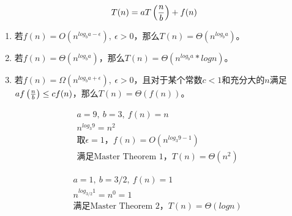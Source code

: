 \vspace{-0.5cm}

$$
	T(n) = aT\left( {n \over b} \right) + f(n)
$$

\begin{enumerate}
	\item 若$ f(n) = O \left( n^{log_b{a-\epsilon}} \right),\ \epsilon > 0 $，那么$ T(n) = \Theta \left( n^{log_b{a}} \right) $。

	\item 若$ f(n) = \Theta \left( n^{log_b{a}} \right) $，那么$ T(n) = \Theta \left( n^{log_b{a}} * logn \right) $。

	\item 若$ f(n) = \Omega \left( n^{log_b{a+\epsilon}} \right),\ \epsilon > 0 $，且对于某个常数$ c < 1 $和充分大的$ n $满足$ af\left( {n \over b} \right) \le cf(n) $，那么$ T(n) = \Theta(f(n)) $。
\end{enumerate}

\vspace{0.5cm}


\vspace{-1cm}

\begin{align*}
	 & a = 9,\ b = 3,\ f(n) = n                                             \\
	 & n^{log_3{9}} = n^2                                                   \\
	 & \text{取}\epsilon = 1\text{，}f(n) = O \left( n^{log_3{9-1}} \right) \\
	 & \text{满足Master Theorem 1，}T(n) = \Theta(n^2)
\end{align*}

\vspace{0.5cm}


\vspace{-1cm}

\begin{align*}
	 & a = 1,\ b = 3/2,\ f(n) = 1                       \\
	 & n^{log_{3/2}{1}} = n^0 = 1                       \\
	 & \text{满足Master Theorem 2，}T(n) = \Theta(logn)
\end{align*}

\vspace{0.5cm}


